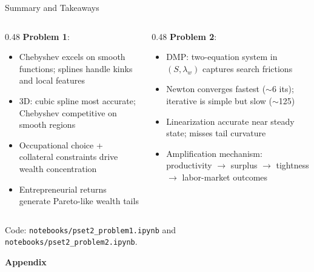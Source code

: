 \documentclass[aspectratio=169,11pt]{beamer}
\begin{document}
\begin{frame}{Summary and Takeaways}
    \begin{columns}[T]
        \begin{column}{0.48\textwidth}
            \textbf{Problem 1}:
            \begin{itemize}
                \item Chebyshev excels on smooth functions; splines handle kinks and local features
                \item 3D: cubic spline most accurate; Chebyshev competitive on smooth regions
                \item Occupational choice + collateral constraints drive wealth concentration
                \item Entrepreneurial returns generate Pareto-like wealth tails
            \end{itemize}
        \end{column}
        \begin{column}{0.48\textwidth}
            \textbf{Problem 2}:
            \begin{itemize}
                \item DMP: two-equation system in $(S, \lambda_w)$ captures search frictions
                \item Newton converges fastest ($\sim$6 its); iterative is simple but slow ($\sim$125)
                \item Linearization accurate near steady state; misses tail curvature
                \item Amplification mechanism: productivity $\to$ surplus $\to$ tightness $\to$ labor-market outcomes
            \end{itemize}
        \end{column}
    \end{columns}
    \vspace{0.5em}
    \centering
    \small
    Code: \texttt{notebooks/pset2\_problem1.ipynb} and \texttt{notebooks/pset2\_problem2.ipynb}.
\end{frame}

\appendix

\begin{frame}[plain]
    \begin{center}
        {\Large \textbf{Appendix}}
    \end{center}
\end{frame}
\end{document}
